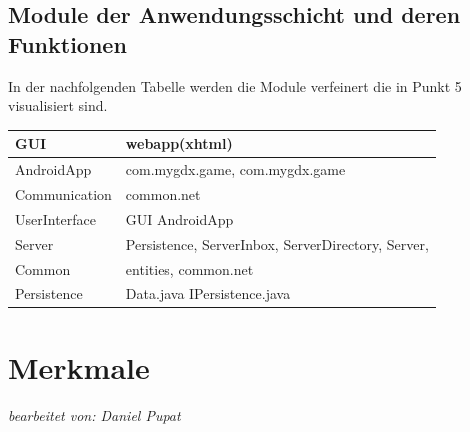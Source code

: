 \documentclass[fontsize=12pt,paper=a4,twoside]{scrartcl}
\begin{document}
\subsection{Module der Anwendungsschicht und deren Funktionen}
\label{mod-controller}

In der nachfolgenden Tabelle werden die Module verfeinert die in Punkt 5 visualisiert sind.

\begin{tabular}{|l|p{12cm}|}
\hline
	GUI & webapp(xhtml)\\
\hline
	AndroidApp & com.mygdx.game, com.mygdx.game\\
\hline
	Communication & common.net\\
\hline
	UserInterface & GUI AndroidApp\\
\hline
	Server & Persistence, ServerInbox, ServerDirectory, Server, \\
\hline
	Common & entities, common.net\\
\hline
	Persistence & Data.java IPersistence.java\\
\hline
\end{tabular}


\clearpage

\section{Merkmale}
\textit{bearbeitet von: Daniel Pupat }\\
\label{c04}
\end{document}
